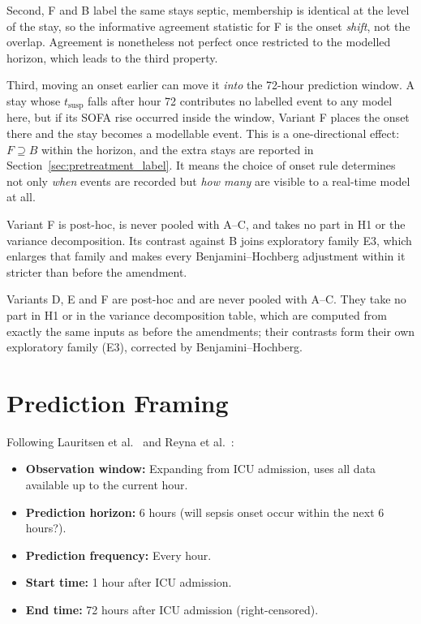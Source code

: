 Second, F and B label the same stays septic, membership is identical at the
level of the stay, so the informative agreement statistic for F is the onset
\emph{shift}, not the overlap. Agreement is nonetheless not perfect once
restricted to the modelled horizon, which leads to the third property.

Third, moving an onset earlier can move it \emph{into} the 72-hour prediction
window. A stay whose $t_{\text{susp}}$ falls after hour 72 contributes no
labelled event to any model here, but if its SOFA rise occurred inside the
window, Variant F places the onset there and the stay becomes a modellable
event. This is a one-directional effect: $F \supseteq B$ within the horizon, and
the extra stays are reported in Section~\ref{sec:pretreatment_label}. It means
the choice of onset rule determines not only \emph{when} events are recorded but
\emph{how many} are visible to a real-time model at all.

Variant F is post-hoc, is never pooled with A--C, and takes no part in H1 or the
variance decomposition. Its contrast against B joins exploratory family E3,
which enlarges that family and makes every Benjamini--Hochberg adjustment within
it stricter than before the amendment.

Variants D, E and F are post-hoc and are never pooled with A--C. They take no
part in H1 or in the variance decomposition table, which are computed from
exactly the same inputs as before the amendments; their contrasts form their own
exploratory family (E3), corrected by Benjamini--Hochberg.


\section{Prediction Framing}
\label{sec:framing}

Following Lauritsen et al.\ \cite{lauritsen2021framing} and Reyna et al.\
\cite{reyna2020utility}:

\begin{itemize}
    \item \textbf{Observation window:} Expanding from ICU admission, uses all
    data available up to the current hour.
    \item \textbf{Prediction horizon:} 6 hours (will sepsis onset occur within the
    next 6 hours?).
    \item \textbf{Prediction frequency:} Every hour.
    \item \textbf{Start time:} 1 hour after ICU admission.
    \item \textbf{End time:} 72 hours after ICU admission (right-censored).
\end{itemize}

